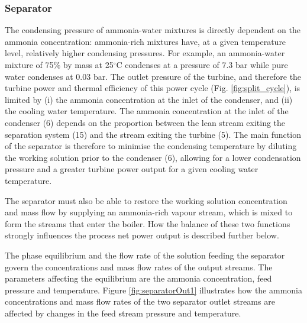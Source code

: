 \documentclass[review,3p]{elsarticle}
\begin{document}
\subsubsection{Separator}
\label{subsec:separator}
The condensing pressure of ammonia-water mixtures is directly dependent on the ammonia concentration: ammonia-rich mixtures have, at a given temperature level, relatively higher condensing pressures. For example, an ammonia-water mixture of 75\% by mass at 25$^\circ$C condenses at a pressure of 7.3 bar while pure water condenses at 0.03 bar. The outlet pressure of the turbine, and therefore the turbine power and thermal efficiency of this power cycle (Fig. \ref{fig:split_cycle}), is limited by (i) the ammonia concentration at the inlet of the condenser, and (ii) the cooling water temperature. The ammonia concentration at the inlet of the condenser (6) depends on the proportion between the lean stream exiting the separation system (15) and the stream exiting the turbine (5). The main function of the separator is therefore to minimise the condensing temperature by diluting the working solution prior to the condenser (6), allowing for a lower condensation pressure and a greater turbine power output for a given cooling water temperature.

The separator must also be able to restore the working solution concentration and mass flow by supplying an ammonia-rich vapour stream, which is mixed to form the streams that enter the boiler. How the balance of these two functions strongly influences the process net power output is described further below. 

The phase equilibrium and the flow rate of the solution feeding the separator govern the concentrations and mass flow rates of the output streams. The parameters affecting the equilibrium are the ammonia concentration, feed pressure and temperature. Figure \ref{fig:separatorOut1} illustrates how the ammonia concentrations and mass flow rates of the two separator outlet streams are affected by changes in the feed stream pressure and temperature. 
\end{document}
